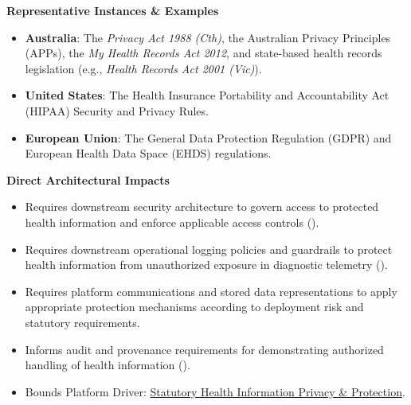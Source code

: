 \par\medskip\textbf{Representative Instances \& Examples}\par


\begin{itemize}


\item \textbf{Australia}: The \emph{Privacy Act 1988 (Cth)}, the Australian Privacy Principles (APPs), the \emph{My Health Records Act 2012}, and state-based health records legislation (e.g., \emph{Health Records Act 2001 (Vic)}).

\item \textbf{United States}: The Health Insurance Portability and Accountability Act (HIPAA) Security and Privacy Rules.

\item \textbf{European Union}: The General Data Protection Regulation (GDPR) and European Health Data Space (EHDS) regulations.

\end{itemize}


\par\medskip\textbf{Direct Architectural Impacts}\par


\begin{itemize}


\item Requires downstream security architecture to govern access to protected health information and enforce applicable access controls (\href{\detokenize{../../../../../docs/markdown/01-motivation/requirements-constraints/master-requirements-catalogue.md}}{\texttt{}}).

\item Requires downstream operational logging policies and guardrails to protect health information from unauthorized exposure in diagnostic telemetry (\href{\detokenize{../../../../../docs/markdown/01-motivation/requirements-constraints/master-requirements-catalogue.md}}{\texttt{}}).

\item Requires platform communications and stored data representations to apply appropriate protection mechanisms according to deployment risk and statutory requirements.

\item Informs audit and provenance requirements for demonstrating authorized handling of health information (\href{\detokenize{../../../../../docs/markdown/01-motivation/requirements-constraints/master-requirements-catalogue.md}}{\texttt{}}).

\item Bounds Platform Driver: \href{\detokenize{../../../../../docs/markdown/01-motivation/drivers-assessments/drivers.md}}{Statutory Health Information Privacy \& Protection}.

\end{itemize}

